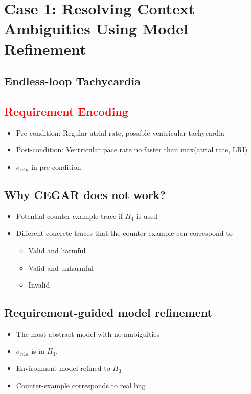 \section{Case 1: Resolving Context Ambiguities Using Model Refinement}
\label{contextAmbiguities}
\subsection{Endless-loop Tachycardia}
\subsection{\textcolor{red}{Requirement Encoding}}
\begin{itemize}
	\item Pre-condition: Regular atrial rate, possible ventricular tachycardia
    \item Post-condition: Ventricular pace rate no faster than max(atrial rate, LRI)
    \item $\sigma_{n1a}$ in pre-condition
\end{itemize}
\subsection{Why CEGAR does not work?}
\begin{itemize}
	\item Potential counter-example trace if $H_4$ is used
    \item Different concrete traces that the counter-example can correspond to
    
    \begin{itemize}
    	\item Valid and harmful
        \item Valid and unharmful
        \item Invalid
    \end{itemize}
\end{itemize}
\subsection{Requirement-guided model refinement}
\begin{itemize}
	\item The most abstract model with no ambiguities
    \item $\sigma_{n1a}$ is in $H_3$.
    \item Environment model refined to $H_3$
    \item Counter-example corresponds to real bug
\end{itemize}